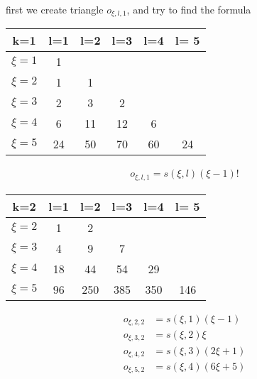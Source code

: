 \\

first we create triangle \(o_{\xi, l, 1}\), and try to find the formula

\begin{table}[h!]
     \centering
     \begin{tabular}{||c| c c c c c ||} 
          \hline
          \hline
          k=1 & l=1 & l=2 & l=3 & l=4 & l= 5 \\ [0.5ex] 
          \hline
          \(\xi = 1\) &1 &  & &&  \\
          \(\xi=2\)   &1 & 1 &  & &  \\
          \(\xi=3\) & 2 & 3 & 2 &  & \\
          \(\xi=4\)  &6 & 11 & 12 & 6 &  \\
          \(\xi=5\)  &24 & 50 & 70 & 60 & 24  \\[1ex] 
          \hline
          \hline
     \end{tabular}
\end{table}

\newpage

\begin{align}
     o_{\xi, l, 1}= s(\xi, l)(\xi-1)!
\end{align}

\begin{table}[h!]
     \centering
     \begin{tabular}{||c| c c c c c ||} 
          \hline
          \hline
          k=2& l=1 & l=2 & l=3 & l=4 & l= 5 \\ [0.5ex] 
          \hline
          \(\xi = 2\) &1 & 2 & &&  \\
          \(\xi=3\)   &4 & 9 & 7 & &  \\
          \(\xi=4\) & 18 & 44 & 54 & 29 & \\
          \(\xi=5\)  &96 & 250 & 385 & 350 & 146  \\ [1ex] 
          \hline
          \hline
     \end{tabular}
\end{table}

\begin{align}
     o_{\xi, 2, 2} &= s(\xi, 1)(\xi-1) \\
     o_{\xi, 3, 2} &= s(\xi, 2)\xi \\
     o_{\xi, 4, 2} &= s(\xi, 3)(2\xi+1) \\
     o_{\xi, 5, 2} &= s(\xi, 4)(6\xi+5) 
\end{align}

